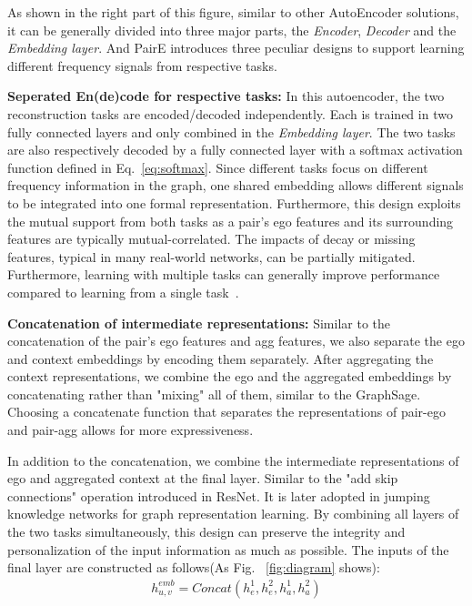 \documentclass[10pt,journal,compsoc]{IEEEtran}
\begin{document}
As shown in the right part of this figure, similar to other AutoEncoder solutions, it can be generally divided into three major parts, the \textit{Encoder}, \textit{Decoder} and the \textit{Embedding layer}. And PairE introduces three peculiar designs to support learning different frequency signals from respective tasks. 


\noindent\textbf{Seperated En(de)code for respective tasks: } In this autoencoder, the two reconstruction tasks are encoded/decoded independently. Each is trained in two fully connected layers and only combined in the \textit{Embedding layer}. The two tasks are also respectively decoded by a fully connected layer with a softmax activation function defined in Eq.~\ref{eq:softmax}. Since different tasks focus on different frequency information in the graph, one shared embedding allows different signals to be integrated into one formal representation. Furthermore, this design exploits the mutual support from both tasks as a pair's ego features and its surrounding features are typically mutual-correlated. The impacts of decay or missing features, typical in many real-world networks, can be partially mitigated. Furthermore, learning with multiple tasks can generally improve performance compared to learning from a single task~\cite{Zhang17}. 

\noindent\textbf{Concatenation of intermediate representations: } Similar to the concatenation of the pair's ego features and agg features, we also separate the ego and context embeddings by encoding them separately. After aggregating the context representations, we combine the ego and the aggregated embeddings by concatenating rather than "mixing" all of them, similar to the GraphSage\cite{hamilton_grapshsage}. Choosing a concatenate function that separates the representations of pair-ego and pair-agg allows for more expressiveness\cite{Zhu2020}.
    
In addition to the concatenation, we combine the intermediate representations of ego and aggregated context at the final layer. Similar to the "add skip connections" operation introduced in ResNet\cite{He16}. It is later adopted in jumping knowledge networks for graph representation learning\cite{xu2018representation}. By combining all layers of the two tasks simultaneously, this design can preserve the integrity and personalization of the input information as much as possible. The inputs of the final layer are constructed as follows(As Fig. ~\ref{fig:diagram} shows):
 \begin{equation}
\begin{aligned}
h_{u,v}^{emb} = Concat(h^{1}_e,h^{2}_e,h^{1}_{a}, h^{2}_{a})
\end{aligned}
\label{eq:concate}
\end{equation}
\end{document}
